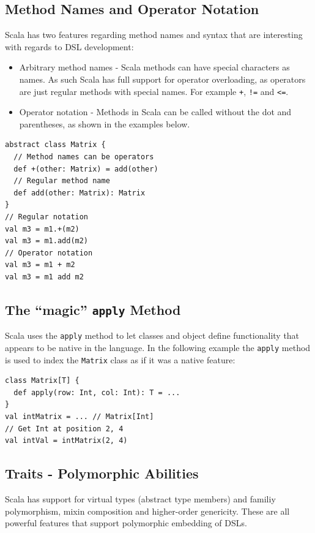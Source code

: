 \documentclass[a4paper,english]{report}
\begin{document}
\subsection{Method Names and Operator Notation}

Scala has two features regarding method names and syntax that are
interesting with regards to DSL development:

\begin{itemize}
\item Arbitrary method names - Scala methods can have special
  characters as names. As such Scala has full support for operator
  overloading, as operators are just regular methods with special
  names. For example \texttt{+}, \texttt{!=} and \texttt{<=}.
\item Operator notation - Methods in Scala can be called without the
  dot and parentheses, as shown in the examples below.
\end{itemize}

\begin{lstlisting}
abstract class Matrix {
  // Method names can be operators
  def +(other: Matrix) = add(other)
  // Regular method name
  def add(other: Matrix): Matrix
}
// Regular notation
val m3 = m1.+(m2)
val m3 = m1.add(m2)
// Operator notation
val m3 = m1 + m2
val m3 = m1 add m2
\end{lstlisting}

\subsection{The ``magic'' \texttt{apply} Method}

Scala uses the \texttt{apply} method to let classes and object define
functionality that appears to be native in the language. In the
following example the \texttt{apply} method is used to index the
\texttt{Matrix} class as if it was a native feature:

\begin{lstlisting}
class Matrix[T] {
  def apply(row: Int, col: Int): T = ...
}
val intMatrix = ... // Matrix[Int]
// Get Int at position 2, 4
val intVal = intMatrix(2, 4)
\end{lstlisting}

\subsection{Traits - Polymorphic Abilities}

Scala has support for virtual types (abstract type members) and
familiy polymorphism\cite{ode03}, mixin composition\cite{ode05} and
higher-order genericity\cite{moo08}. These are all powerful features
that support polymorphic embedding of DSLs\cite{hof08}.
\end{document}
